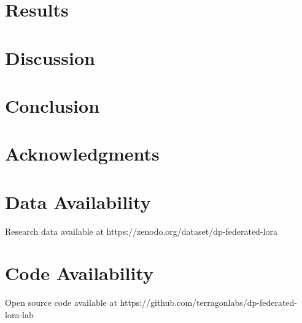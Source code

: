 \documentclass[conference]{IEEEtran}
\begin{document}
\section{Results}

\section{Discussion}

\section{Conclusion}

\section{Acknowledgments}

\section{Data Availability}
Research data available at https://zenodo.org/dataset/dp-federated-lora

\section{Code Availability}
Open source code available at https://github.com/terragonlabs/dp-federated-lora-lab



\end{document}

